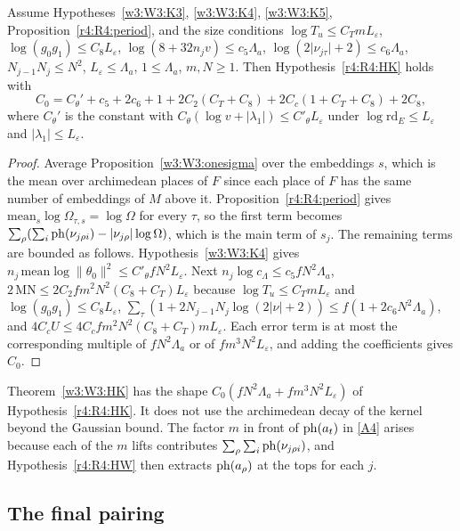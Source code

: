 \begin{theorem}\label{w3:W3:HK}
Assume Hypotheses~\ref{w3:W3:K3}, \ref{w3:W3:K4}, \ref{w3:W3:K5}, Proposition~\ref{r4:R4:period}, and the size conditions $\log T_u\le C_TmL_\varepsilon$, $\log(g_0g_1)\le C_8L_\varepsilon$, $\log(8+32n_jv)\le c_5\Lambda_a$, $\log(2\lvert\nu_{j\tau}\rvert+2)\le c_6\Lambda_a$, $N_{j-1}N_j\le N^2$, $L_\varepsilon\le\Lambda_a$, $1\le\Lambda_a$, $m,N\ge1$. Then Hypothesis~\ref{r4:R4:HK} holds with
\[
C_0=C_\theta'+c_5+2c_6+1+2C_2(C_T+C_8)+2C_c(1+C_T+C_8)+2C_8,
\]
where $C_\theta'$ is the constant with $C_\theta(\log v+\lvert\lambda_1\rvert)\le C'_\theta L_\varepsilon$ under $\log\mathrm{rd}_E\le L_\varepsilon$ and $\lvert\lambda_1\rvert\le L_\varepsilon$.
\end{theorem}

\begin{proof}
Average Proposition~\ref{w3:W3:onesigma} over the embeddings $s$, which is the mean over archimedean places of $F$ since each place of $F$ has the same number of embeddings of $M$ above it. Proposition~\ref{r4:R4:period} gives $\mathrm{mean}_s\log\Omega_{\tau,s}=\log\Omega$ for every $\tau$, so the first term becomes $\sum_\rho(\sum_i\operatorname{ph}(\nu_{j\rho i})-\lvert\nu_{j\rho}\rvert\log\Omega)$, which is the main term of $s_j$. The remaining terms are bounded as follows. Hypothesis~\ref{w3:W3:K4} gives $n_j\,\mathrm{mean}\log\lVert\theta_0\rVert^2\le C'_\theta fN^2L_\varepsilon$. Next $n_j\log c_\Lambda\le c_5fN^2\Lambda_a$, $2\,\mathrm{MN}\le2C_2fm^2N^2(C_8+C_T)L_\varepsilon$ because $\log T_u\le C_TmL_\varepsilon$ and $\log(g_0g_1)\le C_8L_\varepsilon$, $\sum_\tau(1+2N_{j-1}N_j\log(2\lvert\nu\rvert+2))\le f(1+2c_6N^2\Lambda_a)$, and $4C_cU\le4C_cfm^2N^2(C_8+C_T)mL_\varepsilon$. Each error term is at most the corresponding multiple of $fN^2\Lambda_a$ or of $fm^3N^2L_\varepsilon$, and adding the coefficients gives $C_0$.
\end{proof}

\begin{remark}
Theorem~\ref{w3:W3:HK} has the shape $C_0(fN^2\Lambda_a+fm^3N^2L_\varepsilon)$ of Hypothesis~\ref{r4:R4:HK}. It does not use the archimedean decay of the kernel beyond the Gaussian bound. The factor $m$ in front of $\operatorname{ph}(a_t)$ in \eqref{A4} arises because each of the $m$ lifts contributes $\sum_\rho\sum_i\operatorname{ph}(\nu_{j\rho i})$, and Hypothesis~\ref{r4:R4:HW} then extracts $\operatorname{ph}(a_\rho)$ at the tops for each $j$.
\end{remark}

\subsection{The final pairing}\label{w3:sec:HP}

